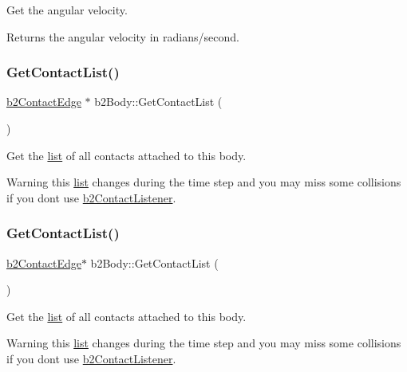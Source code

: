 Get the angular velocity. \begin{DoxyReturn}{Returns}
the angular velocity in radians/second. 
\end{DoxyReturn}
\mbox{\label{classb2Body_a16bdbfb266c82a0ef51be351a8928bc5}} 
\subsubsection{\texorpdfstring{Get\+Contact\+List()}{GetContactList()}\hspace{0.1cm}{\footnotesize\ttfamily [1/2]}}
{\footnotesize\ttfamily \hyperlink{structb2ContactEdge}{b2\+Contact\+Edge} $\ast$ b2\+Body\+::\+Get\+Contact\+List (\begin{DoxyParamCaption}{ }\end{DoxyParamCaption})\hspace{0.3cm}{\ttfamily [inline]}}

Get the \hyperlink{protocollist-p}{list} of all contacts attached to this body. \begin{DoxyWarning}{Warning}
this \hyperlink{protocollist-p}{list} changes during the time step and you may miss some collisions if you don\textquotesingle{}t use \hyperlink{classb2ContactListener}{b2\+Contact\+Listener}. 
\end{DoxyWarning}
\mbox{\label{classb2Body_af0f564c41cd66f1a2f3910e83bf58d61}} 
\subsubsection{\texorpdfstring{Get\+Contact\+List()}{GetContactList()}\hspace{0.1cm}{\footnotesize\ttfamily [2/2]}}
{\footnotesize\ttfamily \hyperlink{structb2ContactEdge}{b2\+Contact\+Edge}$\ast$ b2\+Body\+::\+Get\+Contact\+List (\begin{DoxyParamCaption}{ }\end{DoxyParamCaption})}

Get the \hyperlink{protocollist-p}{list} of all contacts attached to this body. \begin{DoxyWarning}{Warning}
this \hyperlink{protocollist-p}{list} changes during the time step and you may miss some collisions if you don\textquotesingle{}t use \hyperlink{classb2ContactListener}{b2\+Contact\+Listener}. 
\end{DoxyWarning}
\mbox{\label{classb2Body_a60929c13e4b6548492dca5ec79f159db}} 
